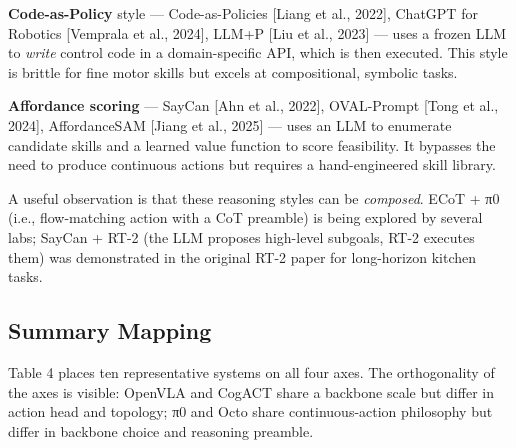 \textbf{Code-as-Policy} style --- Code-as-Policies {[}Liang et al., 2022{]}, ChatGPT for Robotics {[}Vemprala et al., 2024{]}, LLM+P {[}Liu et al., 2023{]} --- uses a frozen LLM to \emph{write} control code in a domain-specific API, which is then executed. This style is brittle for fine motor skills but excels at compositional, symbolic tasks.

\textbf{Affordance scoring} --- SayCan {[}Ahn et al., 2022{]}, OVAL-Prompt {[}Tong et al., 2024{]}, AffordanceSAM {[}Jiang et al., 2025{]} --- uses an LLM to enumerate candidate skills and a learned value function to score feasibility. It bypasses the need to produce continuous actions but requires a hand-engineered skill library.

A useful observation is that these reasoning styles can be \emph{composed}. ECoT + π0 (i.e., flow-matching action with a CoT preamble) is being explored by several labs; SayCan + RT-2 (the LLM proposes high-level subgoals, RT-2 executes them) was demonstrated in the original RT-2 paper for long-horizon kitchen tasks.

\subsection{Summary Mapping}\label{summary-mapping}

Table 4 places ten representative systems on all four axes. The orthogonality of the axes is visible: OpenVLA and CogACT share a backbone scale but differ in action head and topology; π0 and Octo share continuous-action philosophy but differ in backbone choice and reasoning preamble.

